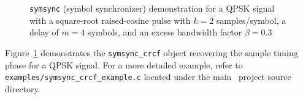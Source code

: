 %
\begin{figure}
\centering
{}
\caption{{\tt symsync} (symbol synchronizer) demonstration for a
         QPSK signal with a
         square-root raised-cosine pulse
         with $k=2$ samples/symbol,
         a delay of $m=4$ symbols, and
         an excess bandwidth factor $\beta=0.3$}
\label{fig:module:filter:symsync}
\end{figure}
%
Figure~\ref{fig:module:filter:symsync} demonstrates the
{\tt symsync\_crcf} object recovering the sample timing phase for a QPSK
signal.
%
For a more detailed example, refer to
{\tt examples/symsync\_crcf\_example.c}
located under the main \liquid\ project source directory.

